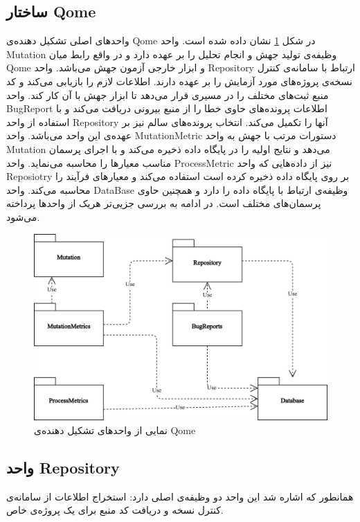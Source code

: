 \subsection{ساختار Qome}
واحدهای اصلی تشکیل دهنده‌ی Qome در شکل \ref{fig:jpredict-module} نشان داده شده‌ است. واحد Mutation وظیفه‌ی تولید جهش و انجام تحلیل را بر عهده دارد و در واقع رابط میان Qome و ابزار  خارجی آزمون جهش می‌باشد. واحد Repository ارتباط با سامانه‌ی کنترل نسخه‌ی پروژه‌های مورد آزمایش را بر عهده دارند. اطلاعات لازم را بازیابی می‌کند و کد منبع ثبت‌های مختلف را در مسیری قرار می‌دهد تا ابزار جهش با آن کار کند. واحد BugReport اطلاعات پرونده‌های حاوی خطا را از منبع بیرونی دریافت می‌کند و با استفاده از واحد Repository آنها را تکمیل می‌کند.  انتخاب پرونده‌های سالم نیز بر عهده‌ی این واحد می‌باشد. واحد MutationMetric دستورات مرتب با جهش به واحد Mutation می‌دهد و نتایج اولیه را در پایگاه داده ذخیره می‌کند و با اجرای پرسمان مناسب معیارها را محاسبه می‌نماید. واحد ProcessMetric نیز  از داده‌هایی که واحد Reposiotry بر روی پایگاه داده ذخیره کرده است استفاده می‌کند و معیارهای فرآیند را محاسبه می‌کند. واحد DataBase وظیفه‌ی ارتباط با پایگاه داده‌ را دارد و همچنین حاوی پرسمان‌های مختلف است. در ادامه به بررسی جزیی‌تر هریک از واحدها پرداخته می‌شود.


\begin{figure}[H]
	\centering
	\includegraphics[width=.8\textwidth]{img/method/component-jpredict.png}
	\caption{ نمایی از واحدهای تشکیل دهنده‌ی Qome}
	\label{fig:jpredict-module}
\end{figure}

\subsection{واحد  Repository}
 
همانطور که اشاره شد این واحد دو وظیفه‌ی اصلی دارد: استخراج اطلاعات از سامانه‌ی کنترل نسخه و دریافت کد منبع برای یک پروژه‌ی خاص. 


